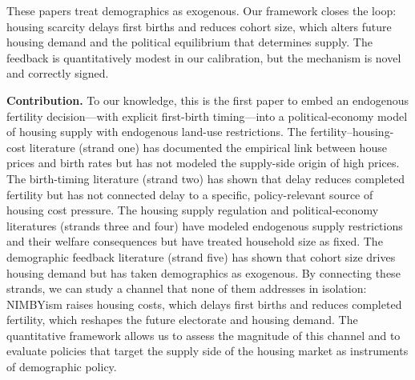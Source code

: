 These papers treat demographics as exogenous. Our framework closes the loop: housing scarcity delays first births and reduces cohort size, which alters future housing demand and the political equilibrium that determines supply. The feedback is quantitatively modest in our calibration, but the mechanism is novel and correctly signed.

\medskip
\noindent\textbf{Contribution.}
To our knowledge, this is the first paper to embed an endogenous fertility decision---with explicit first-birth timing---into a political-economy model of housing supply with endogenous land-use restrictions. The fertility--housing-cost literature (strand one) has documented the empirical link between house prices and birth rates but has not modeled the supply-side origin of high prices. The birth-timing literature (strand two) has shown that delay reduces completed fertility but has not connected delay to a specific, policy-relevant source of housing cost pressure. The housing supply regulation and political-economy literatures (strands three and four) have modeled endogenous supply restrictions and their welfare consequences but have treated household size as fixed. The demographic feedback literature (strand five) has shown that cohort size drives housing demand but has taken demographics as exogenous. By connecting these strands, we can study a channel that none of them addresses in isolation: NIMBYism raises housing costs, which delays first births and reduces completed fertility, which reshapes the future electorate and housing demand. The quantitative framework allows us to assess the magnitude of this channel and to evaluate policies that target the supply side of the housing market as instruments of demographic policy.
